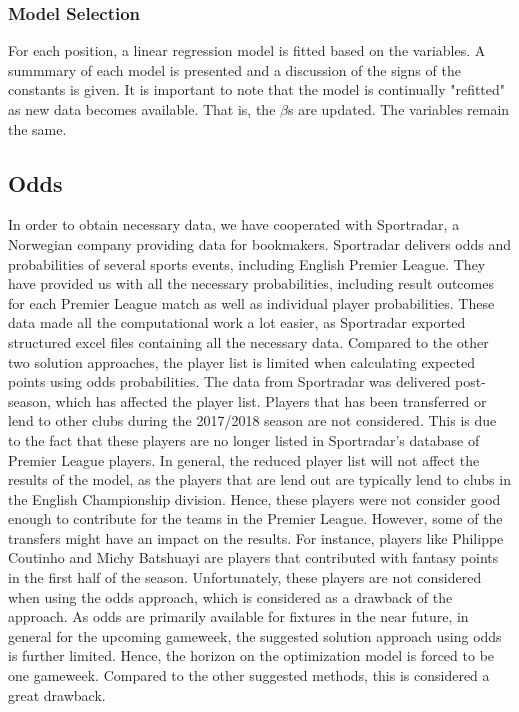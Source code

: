 \subsubsection{Model Selection}

For each position, a linear regression model is fitted based on the variables. A summmary of each model is presented and a discussion of the signs of the constants is given. It is important to note that the model is continually "refitted" as new data becomes available. That is, the $\beta $s are updated. The variables remain the same. \newpar

\subsection{Odds}
In order to obtain necessary data, we have cooperated with Sportradar, a Norwegian company providing data for bookmakers. Sportradar delivers odds and probabilities of several sports events, including English Premier League. They have provided us with all the necessary probabilities, including result outcomes for each Premier League match as well as individual player probabilities. These data made all the computational work a lot easier, as Sportradar exported structured excel files containing all the necessary data. 
\newpar
Compared to the other two solution approaches, the player list is limited when calculating expected points using odds probabilities. The data from Sportradar was delivered post-season, which has affected the player list. Players that has been transferred or lend to other clubs during the 2017/2018 season are not considered. This is due to the fact that these players are no longer listed in Sportradar's database of Premier League players. In general, the reduced player list will not affect the results of the model, as the players that are lend out are typically lend to clubs in the English Championship division. Hence, these players were not consider good enough to contribute for the teams in the Premier League. However, some of the transfers might have an impact on the results. For instance, players like Philippe Coutinho and Michy Batshuayi are players that contributed with fantasy points in the first half of the season. Unfortunately, these players are not considered when using the odds approach, which is considered as a drawback of the approach.  
\newpar
As odds are primarily available for fixtures in the near future, in general for the upcoming gameweek, the suggested solution approach using odds is further limited. Hence, the horizon on the optimization model is forced to be one gameweek. Compared to the other suggested methods, this is considered a great drawback.

